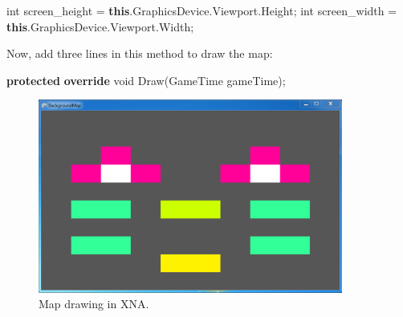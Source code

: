 \documentclass[11pt, a4paper]{article}
\newenvironment{Shaded}{}{}
\newcommand{\KeywordTok}[1]{\textcolor[rgb]{0.00,0.44,0.13}{\textbf{{#1}}}}
\newcommand{\DataTypeTok}[1]{\textcolor[rgb]{0.56,0.13,0.00}{{#1}}}
\newcommand{\FunctionTok}[1]{\textcolor[rgb]{0.02,0.16,0.49}{{#1}}}
\newcommand{\NormalTok}[1]{{#1}}
\begin{document}
\begin{Shaded}
\begin{Highlighting}[]
\DataTypeTok{int} \NormalTok{screen_height = }\KeywordTok{this}\NormalTok{.}\FunctionTok{GraphicsDevice}\NormalTok{.}\FunctionTok{Viewport}\NormalTok{.}\FunctionTok{Height}\NormalTok{;}
\DataTypeTok{int} \NormalTok{screen_width = }\KeywordTok{this}\NormalTok{.}\FunctionTok{GraphicsDevice}\NormalTok{.}\FunctionTok{Viewport}\NormalTok{.}\FunctionTok{Width}\NormalTok{;}
\end{Highlighting}
\end{Shaded}

Now, add three lines in this method to draw the map:

\begin{Shaded}
\begin{Highlighting}[]
\KeywordTok{protected} \KeywordTok{override} \DataTypeTok{void} \FunctionTok{Draw}\NormalTok{(GameTime gameTime);}
\end{Highlighting}
\end{Shaded}

\begin{figure}[h]
\begin{center}
\includegraphics[width=10cm]{../res/mapxna.png}
\end{center}
\caption{Map drawing in XNA.}
\end{figure}
\end{document}
